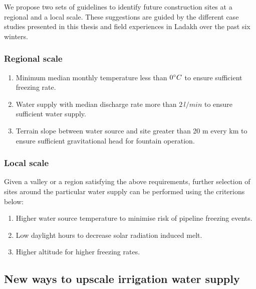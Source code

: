 We propose two sets of guidelines to identify future construction sites at a regional and a local scale. These
suggestions are guided by the different case studies presented in this thesis and field experiences in
Ladakh over the past six winters.

\subsubsection{Regional scale}

\begin{enumerate}

	\item Minimum median monthly temperature less than $0 ^{\circ} C$ to ensure sufficient freezing rate.
	\item Water supply with median discharge rate more than $2\, l/min$ to ensure sufficient water supply.
	\item Terrain slope between water source and site greater than 20 m every km to ensure sufficient
    gravitational head for fountain operation.

\end{enumerate}

\subsubsection{Local scale}

Given a valley or a region satisfying the above requirements, further selection of sites around the particular
water supply can be performed using the criterions below:

\begin{enumerate}
	\item Higher water source temperature to minimise risk of pipeline freezing events.
	\item Low daylight hours to decrease solar radiation induced melt.
	\item Higher altitude for higher freezing rates.
\end{enumerate}

\subsection{New ways to upscale irrigation water supply}

